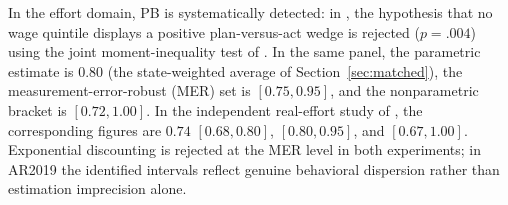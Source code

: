 \documentclass[11pt,a4paper]{article}
\theoremstyle{plain}
\theoremstyle{definition}
\begin{document}
\noindent
In the effort domain, PB is systematically detected: in \citet{augenblick2019}, the hypothesis that no wage quintile displays a positive plan-versus-act wedge is rejected ($p=.004$) using the joint moment-inequality test of \citet{coxshi2023}. In the same panel, the parametric estimate is $0.80$ (the state-weighted average of Section~\ref{sec:matched}), the measurement-error-robust (MER) set is $[0.75, 0.95]$, and the nonparametric bracket is $[0.72, 1.00]$. In the independent real-effort study of \citet{fedyk2024}, the corresponding figures are $0.74$ $[0.68, 0.80]$, $[0.80, 0.95]$, and $[0.67, 1.00]$. %
Exponential discounting is rejected at the MER level in both experiments; in AR2019 the identified intervals reflect genuine behavioral dispersion rather than estimation imprecision alone. 

\end{document}
